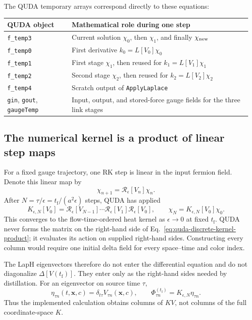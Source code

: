 \documentclass[11pt]{article}
\numberwithin{equation}{section}
\newcommand{\tf}{t_{\mathrm f}}
\begin{document}
The QUDA temporary arrays correspond directly to these equations:
\begin{center}
\begin{tabular}{p{}p{}}
  \toprule
  QUDA object & Mathematical role during one step \\
  \midrule
  \texttt{f\_temp3}
  & Current solution \(\chi_0\), then \(\chi_1\), and finally
    \(\chi_{\rm new}\) \\
  \texttt{f\_temp0}
  & First derivative \(k_0=L[V_0]\chi_0\) \\
  \texttt{f\_temp1}
  & First stage \(\chi_1\), then reused for
    \(k_1=L[V_1]\chi_1\) \\
  \texttt{f\_temp2}
  & Second stage \(\chi_2\), then reused for
    \(k_2=L[V_2]\chi_2\) \\
  \texttt{f\_temp4}
  & Scratch output of \texttt{ApplyLaplace} \\
  \texttt{gin}, \texttt{gout}, \texttt{gaugeTemp}
  & Input, output, and stored-force gauge fields for the three link stages \\
  \bottomrule
\end{tabular}
\end{center}

\subsection{The numerical kernel is a product of linear step maps}

For a fixed gauge trajectory, one RK step is linear in the input fermion
field.  Denote this linear map by
\begin{equation}
  \chi_{n+1}=\mathcal R_\epsilon[V_n]\chi_n.
\end{equation}
After \(N=\tau/\epsilon=\tf/(a^2\epsilon)\) steps, QUDA has applied
\begin{equation}
  K_{\epsilon,N}[V_0]
  =
  \mathcal R_\epsilon[V_{N-1}]\cdots
  \mathcal R_\epsilon[V_1]\mathcal R_\epsilon[V_0],
  \qquad
  \chi_N=K_{\epsilon,N}[V_0]\chi_0.
  \label{eq:quda-discrete-kernel-product}
\end{equation}
This converges to the flow-time-ordered heat kernel as
\(\epsilon\to0\) at fixed \(\tf\).  QUDA never forms the matrix on the
right-hand side of Eq.~\eqref{eq:quda-discrete-kernel-product}; it evaluates
its action on supplied right-hand sides.  Constructing every column would
require one initial delta field for every space--time and color index.

The LapH eigenvectors therefore do not enter the differential equation and do
not diagonalize \(\Delta[V(\tf)]\).  They enter only as the right-hand sides
needed by distillation.  For an eigenvector on source time \(\tau\),
\begin{equation}
  \eta_{\tau n}(t,\bm x,c)
  =\delta_{t\tau}V_{\tau n}(\bm x,c),
  \qquad
  \Phi_{\tau n}^{(\tf)}
  =K_{\epsilon,N}\eta_{\tau n}.
  \label{eq:quda-k-times-v}
\end{equation}
Thus the implemented calculation obtains columns of \(KV\), not columns of
the full coordinate-space \(K\).
\end{document}

